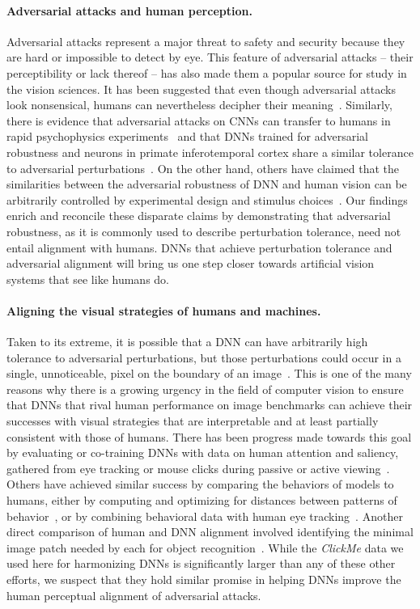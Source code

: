 \documentclass{article}
\theoremstyle{plain}
\theoremstyle{definition}
\theoremstyle{remark}
\begin{document}
\paragraph{Adversarial attacks and human perception.} Adversarial attacks represent a major threat to safety and security because they are hard or impossible to detect by eye. This feature of adversarial attacks -- their perceptibility or lack thereof -- has also made them a popular source for study in the vision sciences. It has been suggested that even though adversarial attacks look nonsensical, humans can nevertheless decipher their meaning~\cite{Zhou2019-lf}. Similarly, there is evidence that adversarial attacks on CNNs can transfer to humans in rapid psychophysics experiments~\cite{Elsayed2018-un} and that DNNs trained for adversarial robustness and neurons in primate inferotemporal cortex share a similar tolerance to adversarial perturbations~\cite{Guo2022-dp}. On the other hand, others have claimed that the similarities between the adversarial robustness of DNN and human vision can be arbitrarily controlled by experimental design and stimulus choices~\cite{Malhotra2020-kj,Dujmovic2020-rv,Malhotra2022-dl}. Our findings enrich and reconcile these disparate claims by demonstrating that adversarial robustness, as it is commonly used to describe perturbation tolerance, need not entail alignment with humans. DNNs that achieve perturbation tolerance and adversarial alignment will bring us one step closer towards artificial vision systems that see like humans do.

\paragraph{Aligning the visual strategies of humans and machines.} Taken to its extreme, it is possible that a DNN can have arbitrarily high tolerance to adversarial perturbations, but those perturbations could occur in a single, unnoticeable, pixel on the boundary of an image~\cite{Malhotra2020-kj}. This is one of the many reasons why there is a growing urgency in the field of computer vision to ensure that DNNs that rival human performance on image benchmarks can achieve their successes with visual strategies that are interpretable and at least partially consistent with those of humans. There has been progress made towards this goal by evaluating or co-training DNNs with data on human attention and saliency, gathered from eye tracking or mouse clicks during passive or active viewing~\cite{Linsley2017-qe,Linsley2019-ew,Jiang2015-vl,Lai2019-ln,Ebrahimpour2019-dc}. Others have achieved similar success by comparing the behaviors of models to humans, either by computing and optimizing for distances between patterns of behavior~\cite{Peterson2018-pu,Roads2020-gd,Sucholutsky2023-wm,Muttenthaler2022-hk}, or by combining behavioral data with human eye tracking~\cite{Langlois2021-ns}. Another direct comparison of human and DNN alignment involved identifying the minimal image patch needed by each for object recognition~\cite{Ullman2016-wy,Funke2018-ft}. While the \emph{ClickMe} data we used here for harmonizing DNNs is significantly larger than any of these other efforts, we suspect that they hold similar promise in helping DNNs improve the human perceptual alignment of adversarial attacks.
\end{document}
